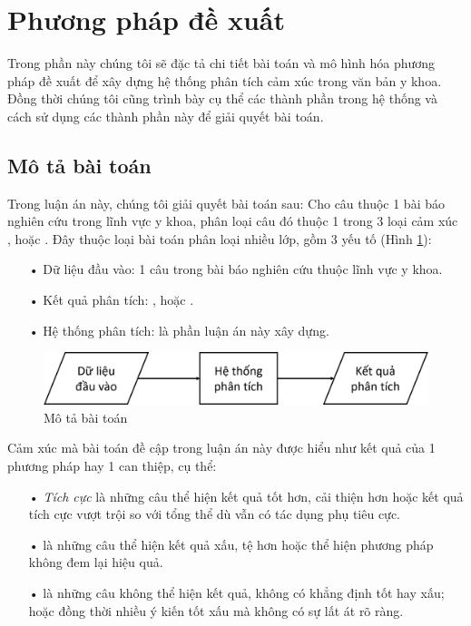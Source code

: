 \section{Phương pháp đề xuất}	\label{sec:phuongphapdexuat}
Trong phần này chúng tôi sẽ đặc tả chi tiết bài toán và mô hình hóa phương pháp đề xuất để xây dựng hệ thống phân tích cảm xúc trong văn bản y khoa. Đồng thời chúng tôi cũng trình bày cụ thể các thành phần trong hệ thống và cách sử dụng các thành phần này để giải quyết bài toán.
\subsection{Mô tả bài toán}
Trong luận án này, chúng tôi giải quyết bài toán sau:
Cho câu thuộc 1 bài báo nghiên cứu trong lĩnh vực y khoa, phân loại câu đó thuộc 1 trong 3 loại cảm xúc \tichcuc, \tieucuc hoặc \trungtinh. Đây thuộc loại bài toán phân loại nhiều lớp, gồm 3 yếu tố (Hình \ref{fig:mo-ta-bai-toan}):
\begin{itemize}[noitemsep]
\item[•] Dữ liệu đầu vào: 1 câu trong bài báo nghiên cứu thuộc lĩnh vực y khoa.
\item[•] Kết quả phân tích: \tichcuc, \tieucuc hoặc \trungtinh.
\item[•] Hệ thống phân tích: là phần luận án này xây dựng.
\end{itemize}
\begin{figure}[h]
\centering
\includegraphics[scale=0.35]{../hinh/mo_ta_bai_toan.png}
\caption{Mô tả bài toán} \label{fig:mo-ta-bai-toan}
\end{figure}
Cảm xúc mà bài toán đề cập trong luận án này được hiểu như kết quả của 1 phương pháp hay 1 can thiệp, cụ thể:
\begin{itemize}
\item[•] \textit{Tích cực} là những câu thể hiện kết quả tốt hơn, cải thiện hơn hoặc kết quả tích cực vượt trội so với tổng thể dù vẫn có tác dụng phụ tiêu cực.\\
\item[•] \tieucuc là những câu thể hiện kết quả xấu, tệ hơn hoặc thể hiện phương pháp không đem lại hiệu quả.\\
\item[•] \trungtinh là những câu không thể hiện kết quả, không có khẳng định tốt hay xấu; hoặc đồng thời nhiều ý kiến tốt xấu mà không có sự lất át rõ ràng.\\
\end{itemize}

